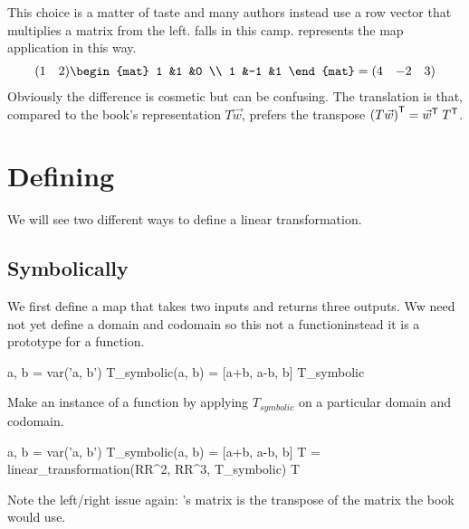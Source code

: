 This choice is a matter of taste and many authors instead
use a row vector that multiplies a matrix from the left.
\Sage{} falls in this camp.
\Sage{} represents the map application in this way.
\begin{equation*}
  \rowvec{1 &2}
  \begin{mat}
    1 &1  &0 \\
    1 &-1 &1
  \end{mat}
  =
  \rowvec{4 &-2 &3}
\end{equation*}
Obviously the difference is cosmetic but can be confusing.
The translation is that, compared to the book's representation $T\vec{w}$,
\Sage{} prefers the transpose
${{(T\vec{w})}^{\textsf{T}}}={{\vec{w}}^{\textsf{T}}}\;{{T}^{\textsf{T}}}$.



  

\section{Defining}
We will see two different ways to define a linear transformation.

\subsection{Symbolically}
We first define a map that takes two inputs and returns three outputs.
Ww need not yet define a domain and codomain 
so this not a function\Dash instead it is a prototype for a function.
\begin{sageoutput}
a, b = var('a, b')   
T_symbolic(a, b) = [a+b, a-b, b]         
T_symbolic       
\end{sageoutput}
Make an instance of a function by applying $T_{\textit{symbolic}}$ on a 
particular domain and codomain.
\begin{sageoutput}[d,0,2;s,7,68,60;s,8,70,60]
a, b = var('a, b')   
T_symbolic(a, b) = [a+b, a-b, b]         
T = linear_transformation(RR^2, RR^3, T_symbolic)
T                                              
\end{sageoutput}
Note the left/right issue again: \Sage's matrix is the transpose of
the matrix the book would use.


